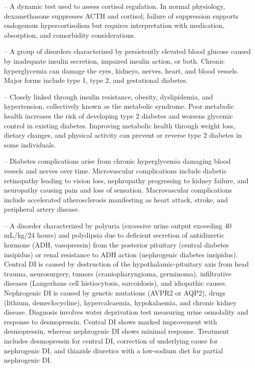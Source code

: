 -- A dynamic test used to assess cortisol regulation. In normal physiology, dexamethasone suppresses ACTH and cortisol; failure of suppression supports endogenous hypercortisolism but requires interpretation with medication, absorption, and comorbidity considerations.

-- A group of disorders characterized by persistently elevated blood glucose caused by inadequate insulin secretion, impaired insulin action, or both. Chronic hyperglycemia can damage the eyes, kidneys, nerves, heart, and blood vessels. Major forms include type 1, type 2, and gestational diabetes.

-- Closely linked through insulin resistance, obesity, dyslipidemia, and hypertension, collectively known as the metabolic syndrome. Poor metabolic health increases the risk of developing type 2 diabetes and worsens glycemic control in existing diabetes. Improving metabolic health through weight loss, dietary changes, and physical activity can prevent or reverse type 2 diabetes in some individuals.

-- Diabetes complications arise from chronic hyperglycemia damaging blood vessels and nerves over time. Microvascular complications include diabetic retinopathy leading to vision loss, nephropathy progressing to kidney failure, and neuropathy causing pain and loss of sensation. Macrovascular complications include accelerated atherosclerosis manifesting as heart attack, stroke, and peripheral artery disease.

-- A disorder characterized by polyuria (excessive urine output exceeding 40 mL/kg/24 hours) and polydipsia due to deficient secretion of antidiuretic hormone (ADH, vasopressin) from the posterior pituitary (central diabetes insipidus) or renal resistance to ADH action (nephrogenic diabetes insipidus). Central DI is caused by destruction of the hypothalamic-pituitary axis from head trauma, neurosurgery, tumors (craniopharyngioma, germinoma), infiltrative diseases (Langerhans cell histiocytosis, sarcoidosis), and idiopathic causes. Nephrogenic DI is caused by genetic mutations (AVPR2 or AQP2), drugs (lithium, demeclocycline), hypercalcaemia, hypokalaemia, and chronic kidney disease. Diagnosis involves water deprivation test measuring urine osmolality and response to desmopressin. Central DI shows marked improvement with desmopressin, whereas nephrogenic DI shows minimal response. Treatment includes desmopressin for central DI, correction of underlying cause for nephrogenic DI, and thiazide diuretics with a low-sodium diet for partial nephrogenic DI.

